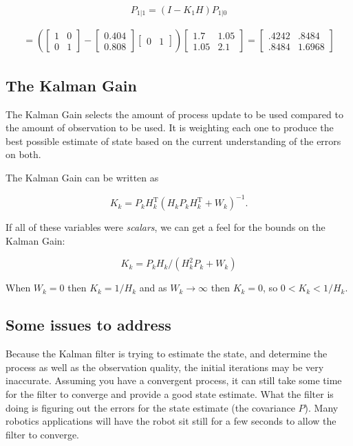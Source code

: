 \begin{itemize}
  \[P_{1|1} = (I - K_1 H) P_{1|0}\]

  \[\begin{aligned}
  = \left( \begin{bmatrix}1 & 0 \\ 0& 1\end{bmatrix}
  -  \begin{bmatrix}0.404 \\ 0.808\end{bmatrix} \begin{bmatrix} 0 & 1\end{bmatrix} \right)
  \begin{bmatrix}1.7 & 1.05 \\ 1.05 & 2.1\end{bmatrix}
  =\begin{bmatrix}.4242 & .8484 \\ .8484 & 1.6968\end{bmatrix}
  \end{aligned}\]
\end{itemize}

\hypertarget{the-kalman-gain}{%
\subsection{The Kalman Gain}\label{the-kalman-gain}}

The Kalman Gain selects the amount of process update to be used compared
to the amount of observation to be used. It is weighting each one to
produce the best possible estimate of state based on the current
understanding of the errors on both.

The Kalman Gain can be written as

\[K_k = P_{k}H_k^\text{T}\left( H_k P_{k} H_k^\text{T} + W_k \right)^{-1}.\]

If all of these variables were \emph{scalars}, we can get a feel for the
bounds on the Kalman Gain:

\[K_k = P_{k}H_k / \left( H_k^2 P_{k} + W_k \right)\]

When \(W_k = 0\) then \(K_k = 1/H_k\) and as \(W_k \to \infty\) then
\(K_k = 0\), so \(0 < K_k < 1/H_k\).

\hypertarget{some-issues-to-address}{%
\subsection{Some issues to address}\label{some-issues-to-address}}

Because the Kalman filter is trying to estimate the state, and determine
the process as well as the observation quality, the initial iterations
may be very inaccurate. Assuming you have a convergent process, it can
still take some time for the filter to converge and provide a good state
estimate. What the filter is doing is figuring out the errors for the
state estimate (the covariance \(P\)). Many robotics applications will
have the robot sit still for a few seconds to allow the filter to
converge.

